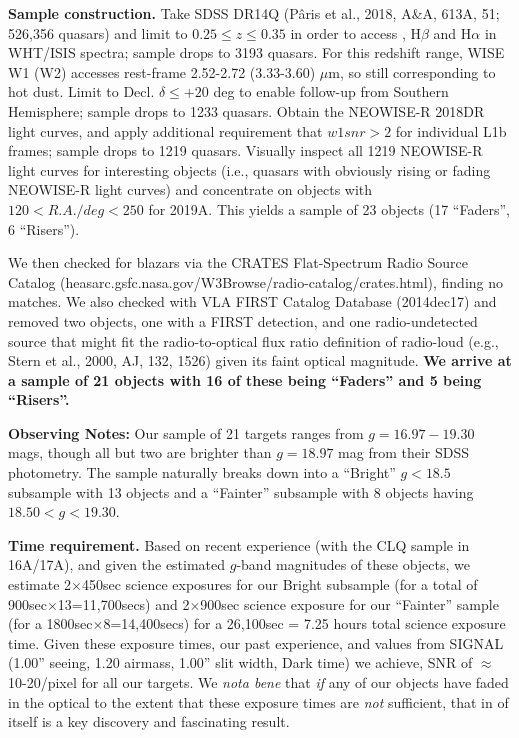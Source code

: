 \documentclass[a4paper,fleqn,usenatbib]{mnras}
\begin{document}
\vskip 0.2cm
{\bf Sample construction.} Take SDSS DR14Q (P{\^a}ris et al., 2018,
A\&A, 613A, 51; 526,356 quasars) and limit to $0.25 \leq z \leq
0.35$ in order to access \mgii, H$\beta$ and H$\alpha$ in WHT/ISIS
spectra; sample drops to 3193 quasars.  For this redshift range,
WISE W1 (W2) accesses rest-frame 2.52-2.72 (3.33-3.60) $\mu$m, so
still corresponding to hot dust.  Limit to Decl. $\delta \leq +20$
deg to enable follow-up from Southern Hemisphere; sample drops to
1233 quasars.  Obtain the NEOWISE-R 2018DR light curves, and apply
additional requirement that $w1snr>2$ for individual L1b frames;
sample drops to 1219 quasars.  Visually inspect all 1219 NEOWISE-R light
curves for interesting objects (i.e., quasars with obviously rising
or fading NEOWISE-R light curves) and concentrate on objects with
$120 < R.A./deg < 250$ for 2019A.  This yields a sample of 23 objects
(17 ``Faders'', 6 ``Risers'').

\smallskip
\smallskip
We then checked for blazars via the CRATES Flat-Spectrum Radio
Source Catalog (heasarc.gsfc.nasa.gov/W3Browse/radio-catalog/crates.html),
finding no matches.  We also checked with VLA FIRST Catalog Database
(2014dec17) and removed two objects, one with a FIRST detection,
and one radio-undetected source that might fit the
radio-to-optical flux ratio definition of radio-loud (e.g., Stern
et al., 2000, AJ, 132, 1526)  given its faint optical magnitude.
{\bf We arrive at a sample of 21 objects with 16 of these being 
``Faders'' and 5 being ``Risers''.}


\vskip 0.2cm
{\bf Observing Notes:} 
Our sample of 21 targets ranges from $g = 16.97-19.30$ mags, though 
all but two are brighter than $g=18.97$ mag from their SDSS photometry. 
The sample naturally breaks down into a ``Bright'' $g<18.5$ subsample with 13 objects 
and a ``Fainter'' subsample with 8 objects having $18.50<g<19.30$. 

\vskip 0.2cm
{\bf Time requirement.}  
Based on recent experience (with the CLQ sample in 16A/17A), and given
the estimated $g$-band magnitudes of these objects, we estimate
2$\times$450sec science exposures for our Bright subsample (for a
total of 900sec$\times$13=11,700secs) and 2$\times$900sec science
exposure for our ``Fainter'' sample (for a 1800sec$\times$8=14,400secs)
for a 26,100sec = 7.25 hours total science exposure time.
Given these exposure times, our past experience, and values from SIGNAL
(1.00'' seeing, 1.20 airmass, 1.00'' slit width, Dark time) we 
achieve, SNR of $\approx$10-20/pixel for all our targets.  
We {\it nota bene} that {\it if} any of our objects have faded in the optical 
to the extent that these exposure times are {\it not} sufficient, that in of 
itself is a key discovery and fascinating result.
\end{document}
